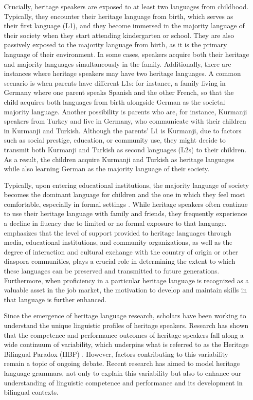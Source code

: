 Crucially, heritage speakers are exposed to at least two languages from childhood. Typically, they encounter their heritage language from birth, which serves as their first language (L1), and they become immersed in the majority language of their society when they start attending kindergarten or school. They are also passively exposed to the majority language from birth, as it is the primary language of their environment. In some cases, speakers acquire both their heritage and majority languages simultaneously in the family. Additionally, there are instances where heritage speakers may have two heritage languages. A common scenario is when parents have different L1s: for instance, a family living in Germany where one parent speaks Spanish and the other French, so that the child acquires both languages from birth alongside German as the societal majority language. Another possibility is parents who are, for instance, Kurmanji speakers from Turkey and live in Germany, who communicate with their children in Kurmanji and Turkish. Although the parents’ L1 is Kurmanji, due to factors such as social prestige, education, or community use, they might decide to transmit both Kurmanji and Turkish as second languages (L2s) to their children. As a result, the children acquire Kurmanji and Turkish as heritage languages while also learning German as the majority language of their society.

Typically, upon entering educational institutions, the majority language of society becomes the dominant language for children and the one in which they feel most comfortable, especially in formal settings \citep{WieseEtAl2022}. While heritage speakers often continue to use their heritage language with family and friends, they frequently experience a decline in fluency due to limited or no formal exposure to that language. \citet{Matras2020} emphasizes that the level of support provided to heritage languages through media, educational institutions, and community organizations, as well as the degree of interaction and cultural exchange with the country of origin or other diaspora communities, plays a crucial role in determining the extent to which these languages can be preserved and transmitted to future generations. Furthermore, when proficiency in a particular heritage language is recognized as a valuable asset in the job market, the motivation to develop and maintain skills in that language is further enhanced.

Since the emergence of heritage language research, scholars have been working to understand the unique linguistic profiles of heritage speakers. Research has shown that the competence and performance outcomes of heritage speakers fall along a wide continuum of variability, which underpins what is referred to as the Heritage Bilingual Paradox (HBP) \citep{SchmidEtAl2019}. However, factors contributing to this variability remain a topic of ongoing debate. Recent research has aimed to model heritage language grammars, not only to explain this variability but also to enhance our understanding of linguistic competence and performance and its development in bilingual contexts.

